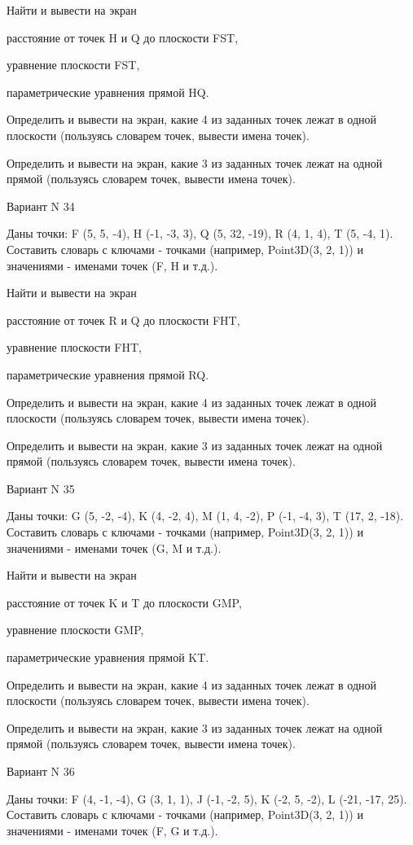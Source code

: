\documentclass[11pt]{report}
\begin{document}
Найти и вывести на экран


расстояние от точек H и Q до плоскости FST,


уравнение плоскости FST,


параметрические уравнения прямой HQ.


Определить и вывести на экран, какие 4 из заданных точек лежат в одной плоскости (пользуясь словарем точек, вывести имена точек).


Определить и вывести на экран, какие 3 из заданных точек лежат на одной прямой (пользуясь словарем точек, вывести имена точек).

\newpage
Вариант N 34

Даны точки: F (5, 5, -4), H (-1, -3, 3), Q (5, 32, -19), R (4, 1, 4), T (5, -4, 1).
Составить словарь с ключами - точками (например, Point3D(3, 2, 1)) и значениями - именами точек (F, H и т.д.).


Найти и вывести на экран


расстояние от точек R и Q до плоскости FHT,


уравнение плоскости FHT,


параметрические уравнения прямой RQ.


Определить и вывести на экран, какие 4 из заданных точек лежат в одной плоскости (пользуясь словарем точек, вывести имена точек).


Определить и вывести на экран, какие 3 из заданных точек лежат на одной прямой (пользуясь словарем точек, вывести имена точек).

\newpage
Вариант N 35

Даны точки: G (5, -2, -4), K (4, -2, 4), M (1, 4, -2), P (-1, -4, 3), T (17, 2, -18).
Составить словарь с ключами - точками (например, Point3D(3, 2, 1)) и значениями - именами точек (G, M и т.д.).


Найти и вывести на экран


расстояние от точек K и T до плоскости GMP,


уравнение плоскости GMP,


параметрические уравнения прямой KT.


Определить и вывести на экран, какие 4 из заданных точек лежат в одной плоскости (пользуясь словарем точек, вывести имена точек).


Определить и вывести на экран, какие 3 из заданных точек лежат на одной прямой (пользуясь словарем точек, вывести имена точек).

\newpage
Вариант N 36

Даны точки: F (4, -1, -4), G (3, 1, 1), J (-1, -2, 5), K (-2, 5, -2), L (-21, -17, 25).
Составить словарь с ключами - точками (например, Point3D(3, 2, 1)) и значениями - именами точек (F, G и т.д.).
\end{document}

